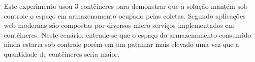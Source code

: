 Este experimento usou 3 contêineres para demonstrar que a solução mantém sob controle o espaço em armazenamento ocupado pelas coletas. 
%
Segundo \cite{StubbsConteinersNumberMicroServices:2015} aplicações web modernas são compostas por diversos micro serviços implementados em contêineres.
%
Neste cenário, entende-se que o espaço do armazenamento consumido ainda estaria sob controle porém em um patamar mais elevado uma vez que a quantidade de contêineres seria maior.
%


